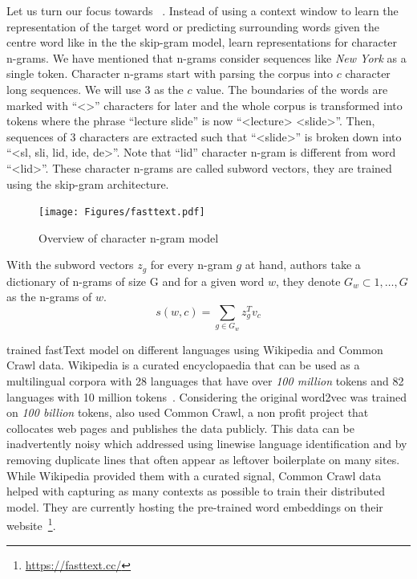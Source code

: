 Let us turn our focus towards ~\cite{bojanowski_enriching_2016}.
Instead of using a context window to learn the representation of the target word or predicting surrounding words given the centre word like in the the skip-gram model, \citeauthor{bojanowski_enriching_2016} learn representations for character n-grams.
We have mentioned that n-grams consider sequences like \emph{New York} as a single token.
Character n-grams start with parsing the corpus into $c$ character long sequences.
We will use 3 as the $c$ value.
The boundaries of the words are marked with \enquote{<>} characters for later and the whole corpus is transformed into tokens where the phrase \enquote{lecture slide} is now \enquote{<lecture> <slide>}.
Then, sequences of 3 characters are extracted such that \enquote{<slide>} is broken down into \enquote{<sl, sli, lid, ide, de>}.
Note that \enquote{lid} character n-gram is different from word \enquote{<lid>}.
These character n-grams are called subword vectors, they are trained using the skip-gram architecture.

\begin{figure}[htbp]
    \centering
    \texttt{[image: Figures/fasttext.pdf]}
    \caption{Overview of character n-gram model}%
    \label{fig:fasttext}
\end{figure}

With the subword vectors $z_g$ for every n-gram $g$ at hand, authors take a dictionary of n-grams of size G and for a given word $w$, they denote $G_{w} \subset {1, \dots, G}$ as the n-grams of $w$.
\begin{displaymath}
    s(w,c) = \sum_{g \in G_{w}}z_{g}^T v_c
\end{displaymath}

\textcite{grave_learning_2018} trained fastText model on different languages using Wikipedia and Common Crawl data.
Wikipedia is a curated encyclopaedia that can be used as a multilingual corpora with 28 languages that have over \emph{100 million} tokens and 82 languages with 10 million tokens~\cite{grave_learning_2018}.
Considering the original word2vec was trained on \emph{100 billion} tokens, \citeauthor{grave_learning_2018} also used Common Crawl, a non profit project that collocates web pages and publishes the data publicly.
This data can be inadvertently noisy which \citeauthor{grave_learning_2018} addressed using linewise language identification and by removing duplicate lines that often appear as leftover boilerplate on many sites.
While Wikipedia provided them with a curated signal, Common Crawl data helped with capturing as many contexts as possible to train their distributed model.
They are currently hosting the pre-trained word embeddings on their website~\footnote{\url{https://fasttext.cc/}}.

